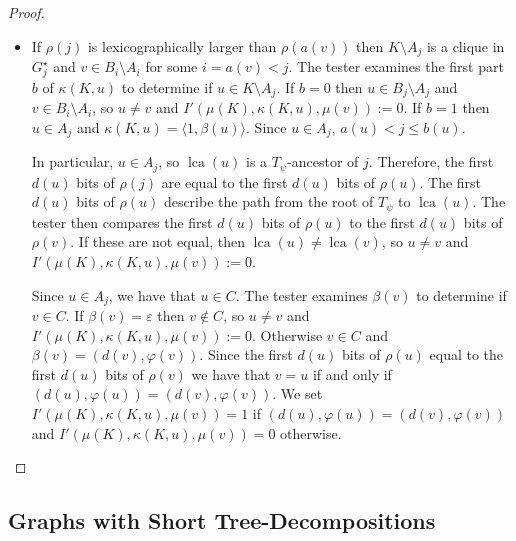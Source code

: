\documentclass{patmorin}
\renewcommand{\le}{\leqslant}
\newcommand{\pat}[1]{\noindent\textcolor{Magenta}{PaMo: #1}}
\newcommand{\piotr}[1]{\noindent\textcolor{red}{PiMi: #1}}
\DeclareMathOperator{\lca}{lca}
\begin{document}
\begin{proof}
\begin{itemize}
       \item If $\rho(j)$ is lexicographically larger than $\rho(a(v))$ then $K\setminus A_j$ is a clique in $G^\star_j$ and $v\in B_i\setminus A_i$ for some $i=a(v) < j$.  The tester examines the first part $b$ of $\kappa(K,u)$ to determine if $u\in K\setminus A_j$.  If $b=0$ then  $u\in B_j\setminus A_j$ and $v\in B_i\setminus A_i$, so $u\neq v$ and $I'(\mu(K),\kappa(K,u),\mu(v)):=0$.  If $b=1$ then $u\in A_j$ and $\kappa(K,u)=\langle 1,\beta(u)\rangle$. Since $u\in A_j$, $a(u) < j\le b(u)$.





       In particular, $u\in A_j$, so $\lca(u)$ is a $T_\psi$-ancestor of $j$.   Therefore, the first $d(u)$ bits of $\rho(j)$ are equal to the first $d(u)$ bits of $\rho(u)$.  The first $d(u)$ bits of $\rho(u)$ describe the path from the root of $T_\psi$ to $\lca(u)$.  The tester then compares the first $d(u)$ bits of $\rho(u)$ to the first $d(u)$ bits of $\rho(v)$.  If these are not equal,  then $\lca(u)\neq\lca(v)$, so $u\neq v$ and $I'(\mu(K),\kappa(K,u),\mu(v)):=0$.

       Since $u\in A_j$, we have that $u\in C$.  The tester examines $\beta(v)$ to determine if $v\in C$.  If $\beta(v)=\varepsilon$ then $v\not\in C$, so $u\neq v$ and $I'(\mu(K),\kappa(K,u),\mu(v)):=0$. Otherwise $v\in C$ and $\beta(v)=(d(v),\varphi(v))$. Since the first $d(u)$ bits of $\rho(u)$ equal to the first $d(u)$ bits of $\rho(v)$ we have that $v=u$ if and only if $(d(u),\varphi(u))=(d(v),\varphi(v))$.
       We set $I'(\mu(K),\kappa(K,u),\mu(v))=1$ if $(d(u),\varphi(u))=(d(v),\varphi(v))$ and $I'(\mu(K),\kappa(K,u),\mu(v))=0$ otherwise.
     \end{itemize}
  \end{proof}



\subsection{Graphs with Short Tree-Decompositions}

\end{document}
